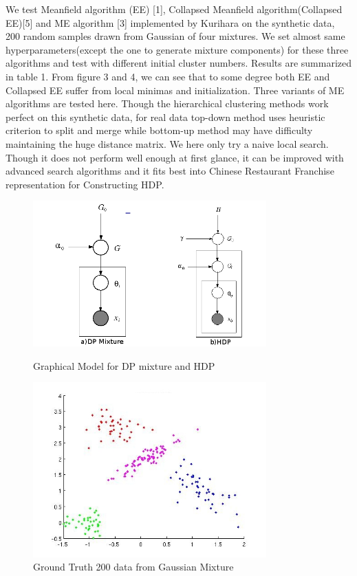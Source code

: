 \documentclass{article}
\begin{document}
We test Meanfield algorithm (EE) [1], Collapsed Meanfield algorithm(Collapsed EE)[5] and ME algorithm [3] implemented by Kurihara on the synthetic data, 200 random samples drawn from Gaussian of four mixtures.
We set almost same hyperparameters(except the one to generate mixture components) for these three algorithms and test with different initial cluster numbers.
Results are summarized in table 1. 
From figure 3 and 4, we can see that to some degree both EE and Collapsed EE suffer from local minimas and initialization.
Three variants of ME algorithms are tested here. Though the hierarchical clustering methods work perfect on this synthetic data, for real data top-down method uses heuristic criterion to split and merge while bottom-up method may have difficulty maintaining the huge distance matrix.
We here only try a naive local search. Though it does not perform well enough at first glance, it can be improved with advanced search algorithms and it fits best into Chinese Restaurant Franchise representation for Constructing HDP.
\begin{figure}[h] 
  \begin{minipage}[b]{0.5\textwidth} 
    \centering 
    \includegraphics[width=0.8\textwidth]{dp.jpg} 
    \caption{Graphical Model for DP mixture and HDP} 
    \label{fig:by:table} 
  \end{minipage}%
  \begin{minipage}[b]{0.5\textwidth} 
    \centering 
    \includegraphics[width=0.8\textwidth]{truth.jpg} 
    \caption{Ground Truth 200 data from Gaussian Mixture} 
    \label{fig:by:table}  
   \end{minipage}%
   \end{figure}
\end{document}

